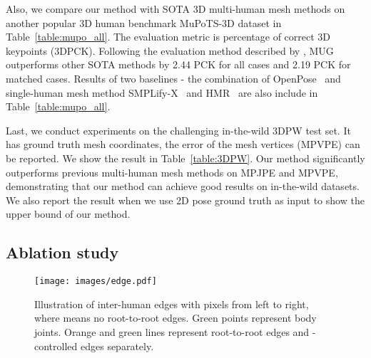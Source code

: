 \documentclass[runningheads]{llncs}
\begin{document}
Also, we compare our method with SOTA 3D multi-human mesh methods on another popular 3D human benchmark MuPoTS-3D dataset in Table~\ref{table:mupo_all}. 
The evaluation metric is percentage of correct 3D keypoints (3DPCK).
Following the evaluation method described by \cite{mehta2018single}, MUG outperforms other SOTA methods by 2.44 PCK for all cases and 2.19 PCK for matched cases. 
Results of two baselines - the combination of OpenPose~\cite{cao2017realtime} and single-human mesh method SMPLify-X~\cite{pavlakos2019expressive} and HMR~\cite{kanazawa2018end} are also include in Table~\ref{table:mupo_all}.

Last, we conduct experiments on the challenging in-the-wild 3DPW test set. 
It has ground truth mesh coordinates, the error of the mesh vertices (MPVPE) can be reported. 
We show the result in Table~\ref{table:3DPW}. 
Our method significantly outperforms previous multi-human mesh methods on MPJPE and MPVPE, demonstrating that our method can achieve good results on in-the-wild datasets. 
We also report the result when we use 2D pose ground truth as input to show the upper bound of our method. 

\subsection{Ablation study}\label{subsection:ablation}
\begin{figure*}[t!]
  \centering
  {\texttt{[image: images/edge.pdf]}
  \vspace{-12pt} 
  \caption{Illustration of inter-human edges with  pixels from left to right, where  means no root-to-root edges. Green points represent body joints. Orange and green lines represent root-to-root edges and -controlled edges separately.} 
  }
  \label{fig:edge}
  \end{figure*}
\end{document}
